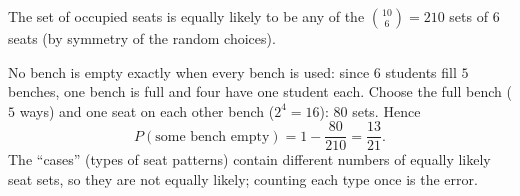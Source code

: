 The set of occupied seats is equally likely to be any of the $\binom{10}6=210$ sets of $6$ seats (by symmetry of the random choices).

No bench is empty exactly when every bench is used: since $6$ students fill $5$ benches, one bench is full and four have one student each. Choose the full bench ($5$ ways) and one seat on each other bench ($2^4=16$): $80$ sets. Hence
\[P(\text{some bench empty})=1-\dfrac{80}{210}=\boxed{\dfrac{13}{21}}.\]
The ``cases'' (types of seat patterns) contain different numbers of equally likely seat sets, so they are not equally likely; counting each type once is the error.
